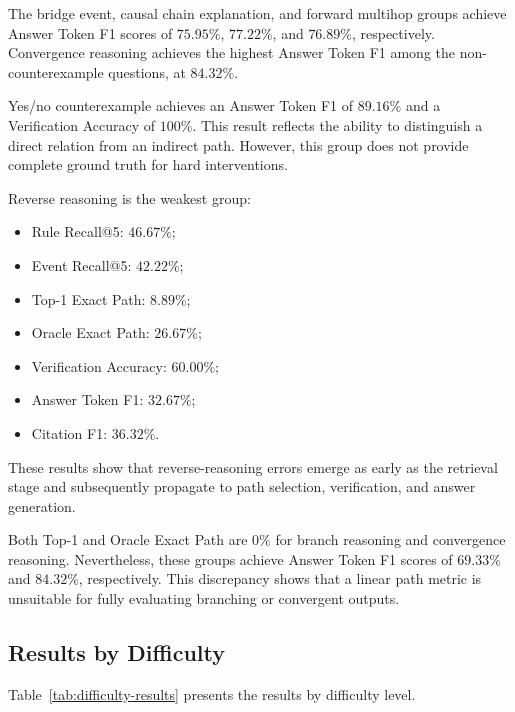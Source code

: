 The bridge event, causal chain explanation, and forward multihop groups
achieve Answer Token F1 scores of \(75.95\%\), \(77.22\%\), and
\(76.89\%\), respectively. Convergence reasoning achieves the highest
Answer Token F1 among the non-counterexample questions, at \(84.32\%\).

Yes/no counterexample achieves an Answer Token F1 of \(89.16\%\) and a
Verification Accuracy of \(100\%\). This result reflects the ability to
distinguish a direct relation from an indirect path. However, this group
does not provide complete ground truth for hard interventions.

Reverse reasoning is the weakest group:

\begin{itemize}
    \item Rule Recall@5: \(46.67\%\);
    \item Event Recall@5: \(42.22\%\);
    \item Top-1 Exact Path: \(8.89\%\);
    \item Oracle Exact Path: \(26.67\%\);
    \item Verification Accuracy: \(60.00\%\);
    \item Answer Token F1: \(32.67\%\);
    \item Citation F1: \(36.32\%\).
\end{itemize}

These results show that reverse-reasoning errors emerge as early as the
retrieval stage and subsequently propagate to path selection, verification,
and answer generation.

Both Top-1 and Oracle Exact Path are \(0\%\) for branch reasoning and
convergence reasoning. Nevertheless, these groups achieve Answer Token F1
scores of \(69.33\%\) and \(84.32\%\), respectively. This discrepancy shows
that a linear path metric is unsuitable for fully evaluating branching or
convergent outputs.

\subsection{Results by Difficulty}

Table~\ref{tab:difficulty-results} presents the results by difficulty level.


